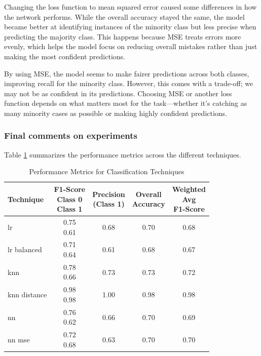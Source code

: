 Changing the loss function to mean squared error caused some differences in how the network performs. While the overall accuracy stayed the same, the model became better at identifying instances of the minority class but less precise when predicting the majority class. This happens because MSE treats errors more evenly, which helps the model focus on reducing overall mistakes rather than just making the most confident predictions.

By using MSE, the model seems to make fairer predictions across both classes, improving recall for the minority class. However, this comes with a trade-off; we may not be as confident in its predictions. Choosing MSE or another loss function depends on what matters most for the task—whether it's catching as many minority cases as possible or making highly confident predictions.

\subsubsection{Final comments on experiments}

Table \ref{tab:metrics} summarizes the performance metrics across the different techniques.


\begin{table}[H]
	\centering
	\begin{tabular}{|l|c|c|c|c|}
		\hline
		\textbf{Technique} & 
		\makecell{F1-Score \\Class 0\\Class 1} & 
		\makecell{Precision \\ (Class 1)} & 
		\makecell{Overall\\Accuracy} & 
		\makecell{Weighted\\Avg\\F1-Score} \\ \hline
		lr & \makecell { 0.75 \\ 0.61 } & 0.68 & 0.70 & 0.68 \\ \hline
		lr balanced & \makecell { 0.71 \\ 0.64 } & 0.61 & 0.68 & 0.67 \\ \hline
		knn & \makecell { 0.78 \\ 0.66 } & 0.73 & 0.73 & 0.72 \\ \hline
		knn distance & \makecell { 0.98 \\ 0.98 } & 1.00 & 0.98 & 0.98 \\ \hline
		nn & \makecell { 0.76 \\ 0.62 } & 0.66 & 0.70 & 0.69 \\ \hline
		nn mse& \makecell { 0.72 \\ 0.68 } & 0.63 & 0.70 & 0.70 \\ \hline
	\end{tabular}
	\caption{Performance Metrics for Classification Techniques}
	\label{tab:metrics}
\end{table}



